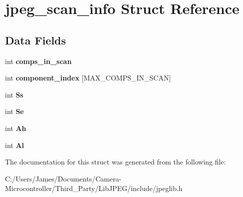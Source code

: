 \hypertarget{structjpeg__scan__info}{}\section{jpeg\+\_\+scan\+\_\+info Struct Reference}
\label{structjpeg__scan__info}
\subsection*{Data Fields}
\begin{DoxyCompactItemize}
\item 
\mbox{\label{structjpeg__scan__info_a4ff3bda3835712b0ce0342e9746cd2ff}} 
int {\bfseries comps\+\_\+in\+\_\+scan}
\item 
\mbox{\label{structjpeg__scan__info_addd665f8ac82adcceb2bcc5ec71beed9}} 
int {\bfseries component\+\_\+index} \mbox{[}M\+A\+X\+\_\+\+C\+O\+M\+P\+S\+\_\+\+I\+N\+\_\+\+S\+C\+AN\mbox{]}
\item 
\mbox{\label{structjpeg__scan__info_ab260a491c6fc19739138894ab7deff0d}} 
int {\bfseries Ss}
\item 
\mbox{\label{structjpeg__scan__info_aa48ad5a8248eacc3a1e32f83d8e042ad}} 
int {\bfseries Se}
\item 
\mbox{\label{structjpeg__scan__info_a0ce329c8f2fc5df5afd401632623c4a5}} 
int {\bfseries Ah}
\item 
\mbox{\label{structjpeg__scan__info_a1e16717d692de3473ea3bb49a75fbb60}} 
int {\bfseries Al}
\end{DoxyCompactItemize}


The documentation for this struct was generated from the following file\+:\begin{DoxyCompactItemize}
\item 
C\+:/\+Users/\+James/\+Documents/\+Camera-\/\+Microcontroller/\+Third\+\_\+\+Party/\+Lib\+J\+P\+E\+G/include/jpeglib.\+h\end{DoxyCompactItemize}
